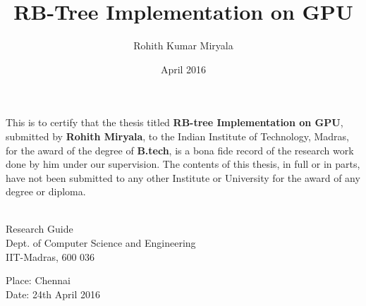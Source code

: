 \documentclass[BTech]{iitmdiss}
\begin{document}

\title{ RB-Tree Implementation on GPU}

\author{Rohith Kumar Miryala}

\date{April 2016}

\maketitle

\certificate

\vspace*{0.5in}

\noindent This is to certify that the thesis titled {\bf RB-tree Implementation on GPU}, submitted by {\bf Rohith Miryala}, 
  to the Indian Institute of Technology, Madras, for
the award of the degree of {\bf B.tech}, is a bona fide
record of the research work done by him under our supervision.  The
contents of this thesis, in full or in parts, have not been submitted
to any other Institute or University for the award of any degree or
diploma.

\vspace*{1.5in}

\begin{singlespacing}
\hspace*{-0.25in}
\parbox{2.5in}{
 \\
\noindent Research Guide \\ 
\noindent Dept. of Computer Science and Engineering\\
\noindent IIT-Madras, 600 036 \\
} 
\hspace*{1.0in} 
\end{singlespacing}
\vspace*{0.25in}
\noindent Place: Chennai\\
Date: 24th April 2016 


\acknowledgements
\end{document}

